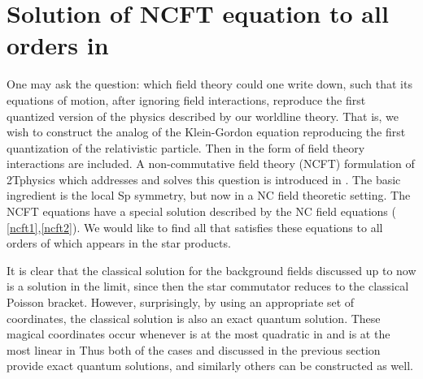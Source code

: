 \documentclass[a4paper,12pt]{article}
\begin{document}
\section{Solution of NCFT equation to all orders in \myHighlight{$\hbar $}\coordHE{}}

One may ask the question: which field theory could one write down, such that
its equations of motion, after ignoring field interactions, reproduce the
first quantized version of the physics described by our worldline theory.
That is, we wish to construct the analog of the Klein-Gordon equation
reproducing the first quantization of the relativistic particle. Then in the
form of field theory interactions are included. A non-commutative field
theory (NCFT) formulation of 2Tphysics which addresses and solves this
question is introduced in \cite{ncsp}. The basic ingredient is the local Sp\myHighlight{$%
\left( 2\right) $}\coordHE{} symmetry, but now in a NC field theoretic setting. The
NCFT equations have a special solution described by the NC field equations (%
\ref{ncft1},\ref{ncft2}). We would like to find all \coordHE{} that satisfies these equations to all orders of \myHighlight{$\hbar $}\coordHE{} which appears in
the star products.

It is clear that the classical solution for the background fields discussed
up to now is a solution in the \coordHE{} limit, since then the
star commutator reduces to the classical Poisson bracket. However,
surprisingly, by using an appropriate set of coordinates, the classical
solution is also an exact quantum solution. These magical coordinates occur
whenever \coordHE{} is at the most quadratic in \coordHE{} and \coordHE{} is at the most linear in \coordHE{} Thus both of
the cases \coordHE{} and \coordHE{} discussed in the previous section
provide exact quantum solutions, and similarly others can be constructed as
well.
\end{document}
